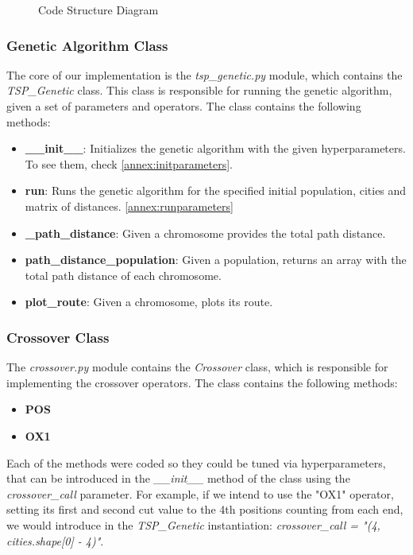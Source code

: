 \documentclass[12pt]{article}
\begin{document}
\begin{enumerate}
\begin{figure}
    \caption{Code Structure Diagram}
    \label{fig:code_structure}
\end{figure}

\subsubsection{Genetic Algorithm Class}
The core of our implementation is the \textit{tsp\_genetic.py} module, which contains the \textit{TSP\_Genetic} class. This class is responsible for running the genetic algorithm, given a set of parameters and operators. The class contains the following methods:
\begin{itemize}
    \item \textbf{\_\_init\_\_}: Initializes the genetic algorithm with the given hyperparameters. To see them, check \ref{annex:initparameters}.
    \item \textbf{run}: Runs the genetic algorithm for the specified initial population, cities and matrix of distances. \ref{annex:runparameters}
    \item \textbf{\_path\_distance}: Given a chromosome provides the total path distance.
    \item \textbf{path\_distance\_population}: Given a population, returns an array with the total path distance of each chromosome.
    \item \textbf{plot\_route}: Given a chromosome, plots its route.
\end{itemize}

\subsubsection{Crossover Class}
The \textit{crossover.py} module contains the \textit{Crossover} class, which is responsible for implementing the crossover operators. The class contains the following methods:
\begin{itemize}
    \item \textbf{POS}
    \item \textbf{OX1}
\end{itemize}
Each of the methods were coded so they could be tuned via hyperparameters, that can be introduced in the \textit{\_\_init\_\_} method of the class using the \textit{crossover\_call} parameter. For example, if we intend to use the "OX1" operator, setting its first and second cut value to the 4th positions counting from each end, we would introduce in the \textit{TSP\_Genetic} instantiation: \textit{crossover\_call = "(4, cities.shape[0] - 4)"}.
    



\end{enumerate}
\end{document}
